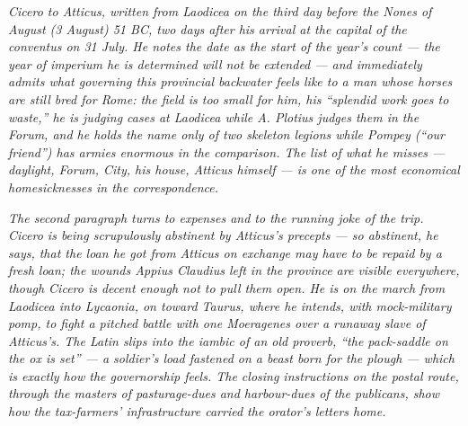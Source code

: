 
\textit{Cicero to Atticus, written from Laodicea on the third day
before the Nones of August (3 August) 51 BC, two days after his
arrival at the capital of the conventus on 31 July. He notes the
date as the start of the year's count --- the year of imperium he
is determined will not be extended --- and immediately admits
what governing this provincial backwater feels like to a man
whose horses are still bred for Rome: the field is too small for
him, his ``splendid work goes to waste,'' he is judging cases at
Laodicea while A. Plotius judges them in the Forum, and he holds
the name only of two skeleton legions while Pompey (``our
friend'') has armies enormous in the comparison. The list of
what he misses --- daylight, Forum, City, his house, Atticus
himself --- is one of the most economical homesicknesses in the
correspondence.}

\textit{The second paragraph turns to expenses and to the running
joke of the trip. Cicero is being scrupulously abstinent by
Atticus's precepts --- so abstinent, he says, that the loan he
got from Atticus on exchange may have to be repaid by a fresh
loan; the wounds Appius Claudius left in the province are
visible everywhere, though Cicero is decent enough not to pull
them open. He is on the march from Laodicea into Lycaonia, on
toward Taurus, where he intends, with mock-military pomp, to
fight a pitched battle with one Moeragenes over a runaway slave
of Atticus's. The Latin slips into the iambic of an old
proverb, ``the pack-saddle on the ox is set'' --- a soldier's
load fastened on a beast born for the plough --- which is
exactly how the governorship feels. The closing instructions on
the postal route, through the masters of pasturage-dues and
harbour-dues of the publicans, show how the tax-farmers'
infrastructure carried the orator's letters home.}
